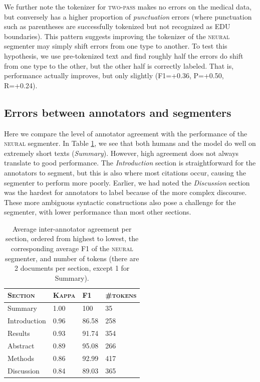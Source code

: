 We further note the tokenizer for \textsc{two-pass} makes no errors on the medical data, but conversely has a higher proportion of \textit{punctuation} errors (where punctuation such as parentheses are successfully tokenized but not recognized as EDU boundaries). This pattern suggests improving the tokenizer of the \textsc{neural} segmenter may simply shift errors from one type to another. To test this hypothesis, we use pre-tokenized text and find roughly half the errors do shift from one type to the other, but the other half is correctly labeled. That is, performance actually improves, but only slightly (F1=+0.36, P=+0.50, R=+0.24).


\subsection{Errors between annotators and segmenters}
Here we compare the level of annotator agreement with the performance of the \textsc{neural} segmenter. In Table \ref{tab:anno_f1}, we see that both humans and the model do well on extremely short texts (\textit{Summary}). However, high agreement does not always translate to good performance. The \textit{Introduction} section is straightforward for the annotators to segment, but this is also where most citations occur, causing the segmenter to perform more poorly. Earlier, we had noted the \textit{Discussion} section was the hardest for annotators to label because of the more complex discourse. These more ambiguous syntactic constructions also pose a challenge for the segmenter, with lower performance than most other sections. 

\begin{table}[]
    \centering
    \begin{tabular}{llll}
    \toprule
         \textsc{Section}&  \textsc{Kappa} & \textsc{F1} & \textsc{\#tokens}\\
         \midrule
         Summary & 1.00 &100 & 35 \\
         Introduction & 0.96 &86.58 & 258 \\
         Results & 0.93 & 91.74 & 354 \\
         Abstract & 0.89 & 95.08 & 266 \\
         Methods & 0.86 & 92.99 & 417 \\
         Discussion & 0.84 & 89.03 & 365 \\
         \bottomrule
    \end{tabular}
    \vspace{-0.6em}
    \caption{Average inter-annotator agreement per section, ordered from highest to lowest, the corresponding average F1 of the \textsc{neural} segmenter, and number of tokens (there are 2 documents per section, except 1 for Summary).}
    \label{tab:anno_f1}
\end{table}

